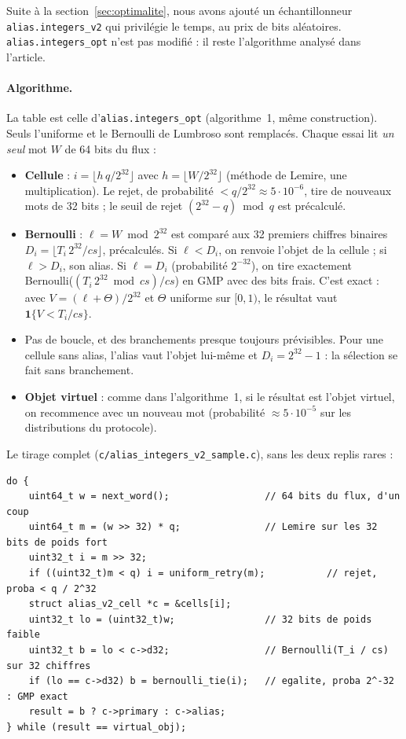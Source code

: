\documentclass[11pt,a4paper]{article}
\newcommand{\code}[1]{\texttt{#1}}
\newcommand{\cs}{\mathit{cs}}
\begin{document}
Suite à la section~\ref{sec:optimalite}, nous avons ajouté un échantillonneur
\code{alias.integers\_v2} qui privilégie le temps, au prix de bits aléatoires.
\code{alias.integers\_opt} n'est pas modifié : il reste l'algorithme analysé dans
l'article.

\paragraph{Algorithme.} La table est celle d'\code{alias.integers\_opt}
(algorithme~1, même construction). Seuls l'uniforme et le Bernoulli de Lumbroso sont
remplacés. Chaque essai lit \emph{un seul} mot $W$ de 64 bits du flux :
\begin{itemize}
\item \textbf{Cellule} : $i = \lfloor h\,q / 2^{32} \rfloor$ avec $h = \lfloor W/2^{32}
  \rfloor$ (méthode de Lemire, une multiplication). Le rejet, de probabilité
  $< q/2^{32} \approx 5\cdot 10^{-6}$, tire de nouveaux mots de 32 bits ; le seuil de
  rejet $(2^{32} - q) \bmod q$ est précalculé.
\item \textbf{Bernoulli} : $\ell = W \bmod 2^{32}$ est comparé aux 32 premiers chiffres
  binaires $D_i = \lfloor T_i\,2^{32}/\cs \rfloor$, précalculés. Si $\ell < D_i$, on
  renvoie l'objet de la cellule ; si $\ell > D_i$, son alias. Si $\ell = D_i$
  (probabilité $2^{-32}$), on tire exactement Bernoulli($(T_i\,2^{32} \bmod \cs)/\cs$)
  en GMP avec des bits frais. C'est exact : avec $V = (\ell + \Theta)/2^{32}$ et
  $\Theta$ uniforme sur $[0, 1)$, le résultat vaut $\mathbf{1}\{V < T_i/\cs\}$.
\item Pas de boucle, et des branchements presque toujours prévisibles. Pour une cellule
  sans alias, l'alias vaut l'objet lui-même et $D_i = 2^{32}-1$ : la sélection se fait
  sans branchement.
\item \textbf{Objet virtuel} : comme dans l'algorithme~1, si le résultat est l'objet
  virtuel, on recommence avec un nouveau mot (probabilité $\approx 5\cdot 10^{-5}$ sur
  les distributions du protocole).
\end{itemize}

\noindent Le tirage complet (\code{c/alias\_integers\_v2\_sample.c}), sans les deux
replis rares :
\begin{lstlisting}
do {
    uint64_t w = next_word();                 // 64 bits du flux, d'un coup
    uint64_t m = (w >> 32) * q;               // Lemire sur les 32 bits de poids fort
    uint32_t i = m >> 32;
    if ((uint32_t)m < q) i = uniform_retry(m);           // rejet, proba < q / 2^32
    struct alias_v2_cell *c = &cells[i];
    uint32_t lo = (uint32_t)w;                // 32 bits de poids faible
    uint32_t b = lo < c->d32;                 // Bernoulli(T_i / cs) sur 32 chiffres
    if (lo == c->d32) b = bernoulli_tie(i);   // egalite, proba 2^-32 : GMP exact
    result = b ? c->primary : c->alias;
} while (result == virtual_obj);
\end{lstlisting}
\end{document}
